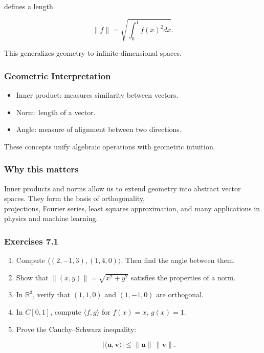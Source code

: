 \documentclass[
  12pt,
  a4paper,
]{article}
\begin{document}
defines a length

\[\|f\| = \sqrt{\int_0^1 f(x)^2 dx}.\]

This generalizes geometry to infinite-dimensional spaces.

\subsubsection{Geometric
Interpretation}\label{geometric-interpretation-13}

\begin{itemize}
\item
  Inner product: measures similarity between vectors.
\item
  Norm: length of a vector.
\item
  Angle: measure of alignment between two directions.
\end{itemize}

These concepts unify algebraic operations with geometric intuition.

\subsubsection{Why this matters}\label{why-this-matters-24}

Inner products and norms allow us to extend geometry into abstract
vector spaces. They form the basis of orthogonality,\\
projections, Fourier series, least squares approximation, and many
applications in physics and machine learning.

\subsubsection{Exercises 7.1}\label{exercises-71}

\begin{enumerate}
\def\labelenumi{\arabic{enumi}.}
\item
  Compute \(\langle (2,-1,3), (1,4,0) \rangle\). Then find the angle
  between them.
\item
  Show that \(\|(x,y)\| = \sqrt{x^2+y^2}\) satisfies the properties of a
  norm.
\item
  In \(\mathbb{R}^3\), verify that \((1,1,0)\) and \((1,-1,0)\) are
  orthogonal.
\item
  In \(C[0,1]\), compute \(\langle f,g \rangle\) for \(f(x)=x\),
  \(g(x)=1\).
\item
  Prove the Cauchy--Schwarz inequality:

  \[|\langle \mathbf{u}, \mathbf{v} \rangle| \leq \|\mathbf{u}\| \, \|\mathbf{v}\|.\]
\end{enumerate}
\end{document}
